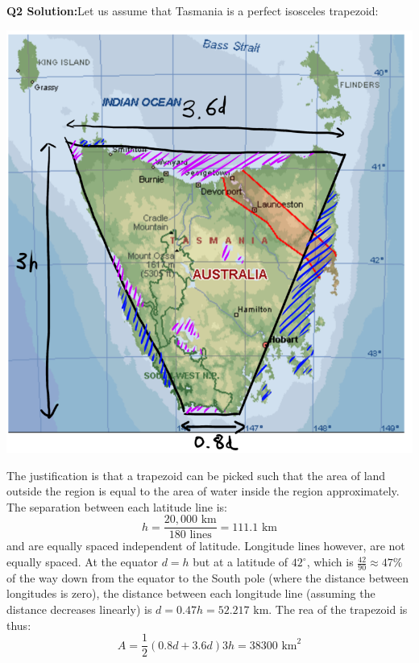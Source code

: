 \documentclass{article}
\begin{document}
\textbf{Q2 Solution:}Let us assume that Tasmania is a perfect isosceles trapezoid:
\begin{center}
    \includegraphics[width=0.5\linewidth]{2011-3-2-S.png}
\end{center}
The justification is that a trapezoid can be picked such that the area of land outside the region is equal to the area of water inside the region approximately. The separation between each latitude line is:
\begin{equation}
    h=\frac{20,000 \text{ km}}{180 \text{ lines}}=111.1 \text{ km}
    \label{eq:}
\end{equation}
and are equally spaced independent of latitude. Longitude lines however, are not equally spaced. At the equator $d=h$ but at a latitude of $42^\circ$, which is $\frac{42}{90}\approx 47\%$ of the way down from the equator to the South pole (where the distance between longitudes is zero), the distance between each longitude line (assuming the distance decreases linearly) is $d=0.47h=52.217 \text{ km}$. The rea of the trapezoid is thus:
\begin{equation}
    A = \frac{1}{2}(0.8d+3.6d)3h=38300 \text{ km}^2
    \label{eq:}
\end{equation}
\end{document}
